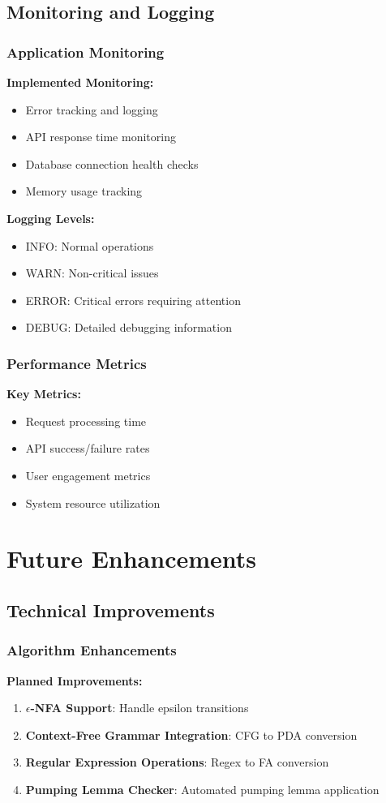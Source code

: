 \documentclass[12pt]{article}
\begin{document}
\subsection{Monitoring and Logging}

\subsubsection{Application Monitoring}
\textbf{Implemented Monitoring:}
\begin{itemize}
    \item Error tracking and logging
    \item API response time monitoring
    \item Database connection health checks
    \item Memory usage tracking
\end{itemize}
\textbf{Logging Levels:}
\begin{itemize}
    \item INFO: Normal operations
    \item WARN: Non-critical issues
    \item ERROR: Critical errors requiring attention
    \item DEBUG: Detailed debugging information
\end{itemize}

\subsubsection{Performance Metrics}
\textbf{Key Metrics:}
\begin{itemize}
    \item Request processing time
    \item API success/failure rates
    \item User engagement metrics
    \item System resource utilization
\end{itemize}

\section{Future Enhancements}

\subsection{Technical Improvements}

\subsubsection{Algorithm Enhancements}
\textbf{Planned Improvements:}
\begin{enumerate}
    \item \textbf{$\epsilon$-NFA Support}: Handle epsilon transitions
    \item \textbf{Context-Free Grammar Integration}: CFG to PDA conversion
    \item \textbf{Regular Expression Operations}: Regex to FA conversion
    \item \textbf{Pumping Lemma Checker}: Automated pumping lemma application
\end{enumerate}
\end{document}
